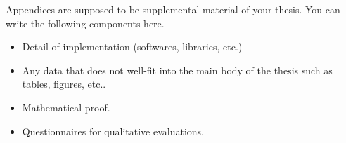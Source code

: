 ﻿Appendices are supposed to be supplemental material of your thesis.
You can write the following components here.
\begin{itemize}
	\item Detail of implementation (softwares, libraries, etc.)
	\item Any data that does not well-fit into the main body of the thesis such as tables, figures, etc..
	\item Mathematical proof.
	\item Questionnaires for qualitative evaluations.
\end{itemize}